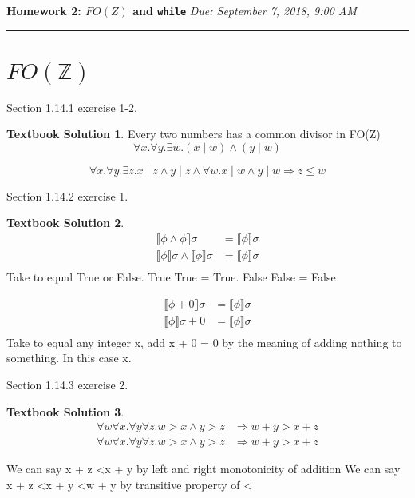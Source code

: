 \documentclass[10pt]{article}
\theoremstyle{definition}
\newtheorem{ts}{Textbook Solution}
\begin{document}
\noindent
\textbf{Homework 2: $FO(Z)$ and \texttt{while}} \hfill \emph{Due: September 7, 2018, 9:00 AM}
\hrule

\vspace{.3in}

\section*{$FO(\mathbb Z)$}

Section 1.14.1 exercise 1-2.

\begin{ts}
 Every two numbers has a common divisor in FO(Z)
 \begin{equation}
 	\forall x. \forall y. \exists w. ( x \mid w) \wedge (y \mid w)
 \end{equation}
 
 \begin{equation}
 	\forall x. \forall y. \exists z. x \mid z \wedge y \mid z \wedge \forall w. x \mid w \wedge y \mid w \Rightarrow z \leq w
 \end{equation}
\end{ts}

Section 1.14.2 exercise 1.

\begin{ts}

\begin{align*}
	\llbracket \phi \wedge \phi \rrbracket \sigma &=  \llbracket \phi \rrbracket \sigma \\ \llbracket \phi \rrbracket \sigma \wedge \llbracket \phi \rrbracket \sigma &=  \llbracket \phi \rrbracket \sigma \\
\end{align*}
 Take \textphi to equal True or False. True \textturnv  True = True. False \textturnv  False = False
 
 \begin{align*}
	\llbracket \phi + 0 \rrbracket \sigma &=  \llbracket \phi \rrbracket \sigma \\ \llbracket \phi \rrbracket \sigma + 0 &=  \llbracket \phi \rrbracket \sigma \\
\end{align*}
Take \textphi to equal any integer x, add x + 0 = 0 by the meaning of adding nothing to something. In this case x. 

\end{ts}

Section 1.14.3 exercise 2.

\begin{ts}

\begin{align*}
\forall w \forall x. \forall y \forall z. w > x \wedge y > z &\Rightarrow w + y > x + z \\ \forall w \forall x. \forall y \forall z. w > x \wedge y > z &\Rightarrow w + y > x + z
\end{align*}

We can say x + z \textless x + y by left and right monotonicity of addition
We can say x + z \textless x + y \textless w + y by transitive property of \textless
\end{ts}
\end{document}
